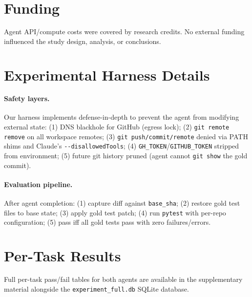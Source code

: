 \documentclass[11pt]{article}
\begin{document}
\section*{Funding}
Agent API/compute costs were covered by research credits. No external funding influenced the
study design, analysis, or conclusions.




\appendix
\section{Experimental Harness Details}
\label{app:harness}

\paragraph{Safety layers.}
Our harness implements defense-in-depth to prevent the agent from modifying external state:
(1) DNS blackhole for GitHub (egress lock);
(2) \texttt{git remote remove} on all workspace remotes;
(3) \texttt{git push/commit/remote} denied via PATH shims and Claude's \texttt{-{}-disallowedTools};
(4) \texttt{GH\_TOKEN}/\texttt{GITHUB\_TOKEN} stripped from environment;
(5) future git history pruned (agent cannot \texttt{git show} the gold commit).

\paragraph{Evaluation pipeline.}
After agent completion: (1) capture diff against \texttt{base\_sha};
(2) restore gold test files to base state;
(3) apply gold test patch;
(4) run \texttt{pytest} with per-repo configuration;
(5) pass iff all gold tests pass with zero failures/errors.

\section{Per-Task Results}
\label{app:pertask}

Full per-task pass/fail tables for both agents are available in the supplementary material alongside the \texttt{experiment\_full.db} SQLite database.
\end{document}
